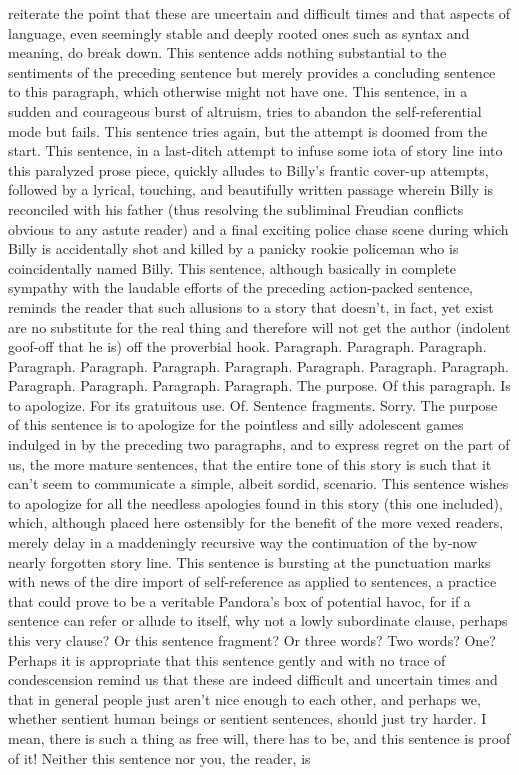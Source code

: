 reiterate the point that these are uncertain and difficult times and that aspects of language, even seemingly stable and deeply rooted ones such as syntax and meaning, do break down. This sentence adds nothing substantial to the sentiments of the preceding sentence but merely provides a concluding sentence to this paragraph, which otherwise might not have one. This sentence, in a sudden and courageous burst of altruism, tries to abandon the self-referential mode but fails. This sentence tries again, but the attempt is doomed from the start. This sentence, in a last-ditch attempt to infuse some iota of story line into this paralyzed prose piece, quickly alludes to Billy's frantic cover-up attempts, followed by a lyrical, touching, and beautifully written passage wherein Billy is reconciled with his father (thus resolving the subliminal Freudian conflicts obvious to any astute reader) and a final exciting police chase scene during which Billy is accidentally shot and killed by a panicky rookie policeman who is coincidentally named Billy. This sentence, although basically in complete sympathy with the laudable efforts of the preceding action-packed sentence, reminds the reader that such allusions to a story that doesn't, in fact, yet exist are no substitute for the real thing and therefore will not get the author (indolent goof-off that he is) off the proverbial hook. Paragraph. Paragraph. Paragraph. Paragraph. Paragraph. Paragraph. Paragraph. Paragraph. Paragraph. Paragraph. Paragraph. Paragraph. Paragraph. Paragraph. The purpose. Of this paragraph. Is to apologize. For its gratuitous use. Of. Sentence fragments. Sorry. The purpose of this sentence is to apologize for the pointless and silly adolescent games indulged in by the preceding two paragraphs, and to express regret on the part of us, the more mature sentences, that the entire tone of this story is such that it can't seem to communicate a simple, albeit sordid, scenario. This sentence wishes to apologize for all the needless apologies found in this story (this one included), which, although placed here ostensibly for the benefit of the more vexed readers, merely delay in a maddeningly recursive way the continuation of the by-now nearly forgotten story line. This sentence is bursting at the punctuation marks with news of the dire import of self-reference as applied to sentences, a practice that could prove to be a veritable Pandora's box of potential havoc, for if a sentence can refer or allude to itself, why not a lowly subordinate clause, perhaps this very clause? Or this sentence fragment? Or three words? Two words? One? Perhaps it is appropriate that this sentence gently and with no trace of condescension remind us that these are indeed difficult and uncertain times and that in general people just aren't nice enough to each other, and perhaps we, whether sentient human beings or sentient sentences, should just try harder. I mean, there is such a thing as free will, there has to be, and this sentence is proof of it! Neither this sentence nor you, the reader, is 



